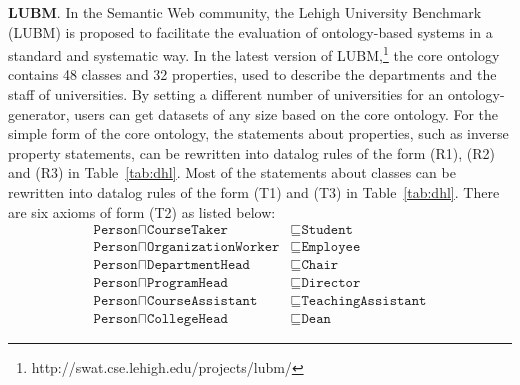 \textbf{LUBM}. In the Semantic Web community, 
the Lehigh University Benchmark (LUBM) is proposed to
facilitate the evaluation of ontology-based systems
in a standard and systematic way.
In the latest version of LUBM,\footnote{http://swat.cse.lehigh.edu/projects/lubm/}
the core ontology contains 48 classes and 32 properties, used to describe the departments and the staff of
universities. By setting a different number of universities for an ontology-generator, users can get datasets of any size based on the core ontology.
%
For the simple form of the core ontology,
the statements about properties, such as inverse property statements,
can be rewritten into datalog rules of the form (R1), (R2) and (R3) in Table~\ref{tab:dhl}.
Most of the statements about classes can be rewritten into datalog rules of the form (T1) and (T3)
in Table~\ref{tab:dhl}. There are six axioms of form (T2) as listed below:
\begin{align}
\texttt{Person}\sqcap\texttt{CourseTaker} & \sqsubseteq\texttt{Student}\label{lubm:a1}\tag{$\alpha_1$}\\
\texttt{Person}\sqcap\texttt{OrganizationWorker} & \sqsubseteq\texttt{Employee}\label{lubm:a2}\tag{$\alpha_2$}\\
\texttt{Person}\sqcap\texttt{DepartmentHead} & \sqsubseteq\texttt{Chair}\label{lubm:a3}\tag{$\alpha_3$}\\
\texttt{Person}\sqcap\texttt{ProgramHead} & \sqsubseteq\texttt{Director}\label{lubm:a4}\tag{$\alpha_4$}\\
\texttt{Person}\sqcap\texttt{CourseAssistant} & \sqsubseteq\texttt{TeachingAssistant}\label{lubm:a5}\tag{$\alpha_5$}\\
\texttt{Person}\sqcap\texttt{CollegeHead} & \sqsubseteq\texttt{Dean}\label{lubm:a6}\tag{$\alpha_6$}
\end{align}
